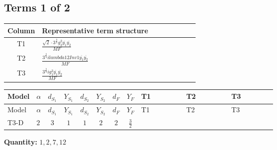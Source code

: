 \documentclass[8pt]{article}
\begin{document}
\begin{landscape}
\subsection*{Terms 1 of 2}
\begin{center}
\begin{tabular}{@{}c >{\raggedright\arraybackslash}p{0.82\linewidth}@{}}
\toprule
Column & Representative term structure \\
\midrule
T1 & \(\displaystyle \frac{\sqrt{2} \cdot 3^{\frac{3}{4}} g_{2}^{2} \overline{y_{1}} \overline{y_{2}}}{MF}\) \\
\midrule
T2 & \(\displaystyle \frac{3^{\frac{3}{4}} i lambda12Inv1 \overline{y_{1}} \overline{y_{2}}}{MF}\) \\
\midrule
T3 & \(\displaystyle \frac{3^{\frac{3}{4}} i g_{1}^{2} \overline{y_{1}} \overline{y_{2}}}{MF}\) \\
\midrule
\bottomrule
\end{tabular}
\end{center}
\smallskip
\tiny
\begin{longtable}{@{}llcccccc >{\raggedright\arraybackslash}p{0.21\linewidth} >{\raggedright\arraybackslash}p{0.21\linewidth} >{\raggedright\arraybackslash}p{0.21\linewidth}@{}}
\toprule
Model & $\alpha$ & $d_{S_1}$ & $Y_{S_1}$ & $d_{S_2}$ & $Y_{S_2}$ & $d_F$ & $Y_F$ & T1 & T2 & T3 \\
\midrule
\endfirsthead
\toprule
Model & $\alpha$ & $d_{S_1}$ & $Y_{S_1}$ & $d_{S_2}$ & $Y_{S_2}$ & $d_F$ & $Y_F$ & T1 & T2 & T3 \\
\midrule
\endhead
T3-D & $2$ & $3$ & $1$ & $1$ & $2$ & $2$ & $\frac{3}{2}$ & \scriptsize\adjustbox{max width=\linewidth}{$\begin{gathered} - \frac{\sqrt{2} \cdot 3^{\frac{3}{4}} g_{2}^{2} \overline{y_{1}} \overline{y_{2}}}{6 MF}\end{gathered}$} & \scriptsize\adjustbox{max width=\linewidth}{$\begin{gathered} \frac{3^{\frac{3}{4}} i lambda12Inv1 \overline{y_{1}} \overline{y_{2}}}{6 MF}\end{gathered}$} & \scriptsize\adjustbox{max width=\linewidth}{$\begin{gathered} \frac{9 \cdot 3^{\frac{3}{4}} i g_{1}^{2} \overline{y_{1}} \overline{y_{2}}}{8 MF}\end{gathered}$} \\
\midrule
\bottomrule
\end{longtable}
\clearpage
\noindent\textbf{Quantity: }$\mathrm{1,2,7,12}$\par\smallskip

\end{landscape}
\end{document}
